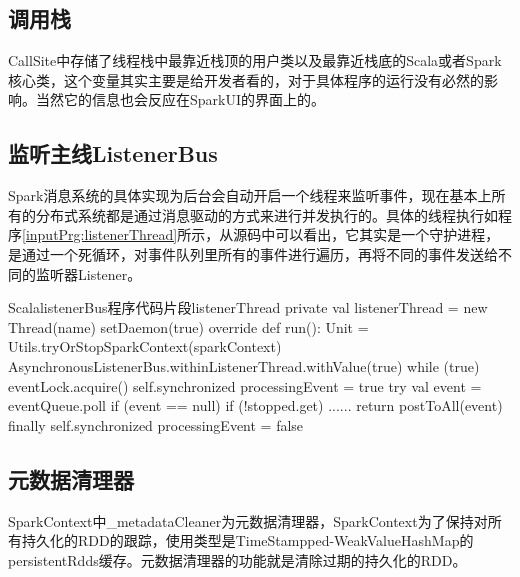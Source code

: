 \subsection{调用栈}
CallSite中存储了线程栈中最靠近栈顶的用户类以及最靠近栈底的Scala或者Spark核心类，这个变量其实主要是给开发者看的，对于具体程序的运行没有必然的影响。当然它的信息也会反应在SparkUI的界面上的。
\subsection{监听主线ListenerBus}
Spark消息系统的具体实现为后台会自动开启一个线程来监听事件，现在基本上所有的分布式系统都是通过消息驱动的方式来进行并发执行的。具体的线程执行如程序\ref{inputPrg:listenerThread}所示，从源码中可以看出，它其实是一个守护进程，是通过一个死循环，对事件队列里所有的事件进行遍历，再将不同的事件发送给不同的监听器Listener。
\begin{codeInput}{Scala}{listenerBus程序代码片段}{listenerThread}
private val listenerThread = new Thread(name) {
  setDaemon(true)
  override def run(): Unit = Utils.tryOrStopSparkContext(sparkContext) {
    AsynchronousListenerBus.withinListenerThread.withValue(true) {
      while (true) {
        eventLock.acquire()
          self.synchronized {
            processingEvent = true
          }
        try {
          val event = eventQueue.poll
          if (event == null) {
            if (!stopped.get) {
              ......
            }
            return
          }
          postToAll(event)
        } finally {
          self.synchronized {
            processingEvent = false
          }
        }
      }
    }
  }
}
\end{codeInput}
\subsection{元数据清理器}
SparkContext中\_metadataCleaner为元数据清理器，SparkContext为了保持对所有持久化的RDD的跟踪，使用类型是TimeStampped-WeakValueHashMap的persistentRdds缓存。元数据清理器的功能就是清除过期的持久化的RDD。
